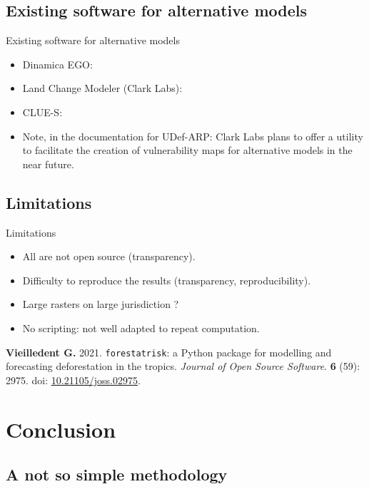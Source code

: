 \documentclass[10pt,table,dvipsnames,compress]{beamer}
\begin{document}
\subsection{Existing software for alternative models}
\label{sec:org2ab8053}

\begin{frame}[label={sec:orgb19ceb0}]{Existing software for alternative models}
\begin{itemize}
\item Dinamica EGO:
\item Land Change Modeler (Clark Labs):
\item CLUE-S:
\item Note, in the documentation for UDef-ARP: Clark Labs plans to offer a utility to facilitate the creation of vulnerability maps for
alternative models in the near future.
\end{itemize}
\end{frame}

\subsection{Limitations}
\label{sec:org54aac28}

\begin{frame}[label={sec:org563810b},fragile]{Limitations}
 \begin{itemize}
\item All are not open source (transparency).
\item Difficulty to reproduce the results (transparency, reproducibility).
\item Large rasters on large jurisdiction ?
\item No scripting: not well adapted to repeat computation.
\end{itemize}

\textbf{Vieilledent G.} 2021. \texttt{forestatrisk}: a Python package for modelling and forecasting deforestation in the tropics. \emph{Journal of Open Source Software}. \textbf{6} (59): 2975. doi: \href{https://doi.org/10.21105/joss.02975}{10.21105/joss.02975}.
\end{frame}

\section{Conclusion}
\label{sec:org5dd7c99}

\subsection{A not so simple methodology}
\label{sec:org2508ac5}
\end{document}
